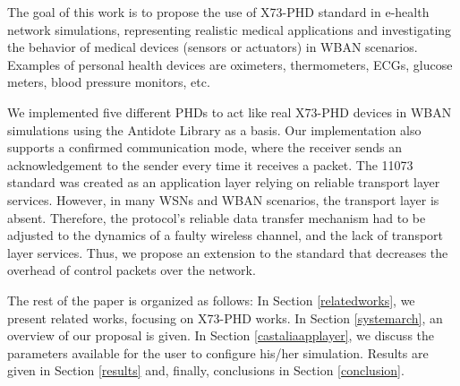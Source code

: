 The goal of this work is to propose the use of X73-PHD standard in e-health network simulations, representing realistic medical applications and investigating the behavior of medical devices (sensors or actuators) in WBAN scenarios. Examples of personal health devices are oximeters, thermometers, ECGs, glucose meters, blood pressure monitors, etc. 

We  implemented  five  different PHDs   to   act   like   real  X73-PHD   devices   in   WBAN  simulations using the Antidote Library \cite{b20} as a basis.  Our  implementation also   supports   a   confirmed   communication   mode,   where the receiver  sends  an  acknowledgement  to  the  sender  every  time  it receives  a  packet. The 11073 standard was created as an application layer relying on reliable transport layer services. However, in many WSNs and WBAN scenarios, the transport layer is absent. Therefore, the protocol's reliable data transfer mechanism had to be adjusted to the dynamics of a faulty wireless channel, and the lack of transport layer services. Thus, we  propose  an  extension  to  the  standard  that  decreases  the overhead  of  control  packets  over  the  network. 

The rest of the paper is organized as follows: In Section \ref{relatedworks}, we present related works, focusing on X73-PHD works. In Section \ref{systemarch}, an overview of our proposal is given. In Section \ref{castaliaapplayer}, we discuss the parameters available for the user to configure his/her simulation. Results are given in Section \ref{results} and, finally, conclusions in Section \ref{conclusion}.
